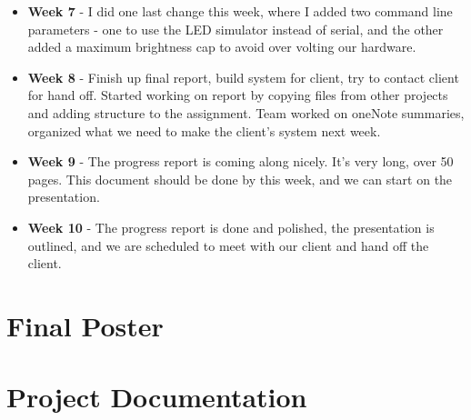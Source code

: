 \documentclass[onecolumn, draftclsnofoot,10pt, compsoc]{IEEEtran}
\begin{document}
\begin{itemize}
					\item \textbf{Week 7} - I did one last change this week, where I added two command line parameters - one to use the LED simulator instead of serial, and the other added a maximum brightness cap to avoid over volting our hardware. 
					\item \textbf{Week 8} - Finish up final report, build system for client, try to contact client for hand off. Started working on report by copying files from other projects and adding structure to the assignment. Team worked on oneNote summaries, organized what we need to make the client's system next week. 
					\item \textbf{Week 9} - The progress report is coming along nicely. It's very long, over 50 pages. This document should be done by this week, and we can start on the presentation.  
					\item \textbf{Week 10} - The progress report is done and polished, the presentation is outlined, and we are scheduled to meet with our client and hand off the client. 
				\end{itemize}

	\section{Final Poster}


	\section{Project Documentation}
\end{document}
